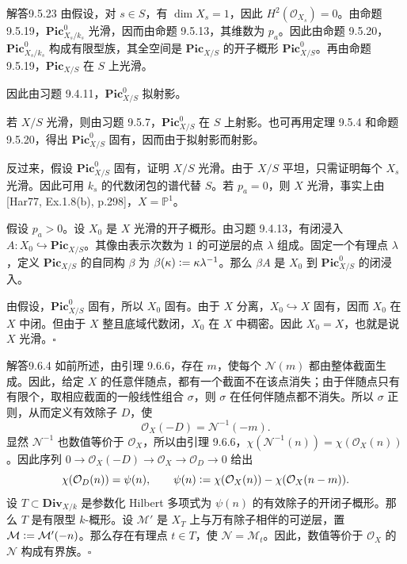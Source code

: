 \begin{origstatement}{解答}{9.5.23}\label{appA:ans9523}
由假设，对 $s\in S$，有 $\dim X_s=1$，因此 $H^2(\mathcal O_{X_s})=0$。由命题 9.5.19，$\mathbf{Pic}_{X_s/k_s}^0$ 光滑，因而由命题 9.5.13，其维数为 $p_a$。因此由命题 9.5.20，$\mathbf{Pic}_{X_s/k_s}^0$ 构成有限型族，其全空间是 $\mathbf{Pic}_{X/S}$ 的开子概形 $\mathbf{Pic}_{X/S}^0$。再由命题 9.5.19，$\mathbf{Pic}_{X/S}$ 在 $S$ 上光滑。

因此由习题 9.4.11，$\mathbf{Pic}_{X/S}^0$ 拟射影。

若 $X/S$ 光滑，则由习题 9.5.7，$\mathbf{Pic}_{X/S}^0$ 在 $S$ 上射影。也可再用定理 9.5.4 和命题 9.5.20，得出 $\mathbf{Pic}_{X/S}^0$ 固有，因而由于拟射影而射影。

反过来，假设 $\mathbf{Pic}_{X/S}^0$ 固有，证明 $X/S$ 光滑。由于 $X/S$ 平坦，只需证明每个 $X_s$ 光滑。因此可用 $k_s$ 的代数闭包的谱代替 $S$。若 $p_a=0$，则 $X$ 光滑，事实上由 [Har77, Ex.1.8(b), p.298]，$X=\mathbb P^1$。

假设 $p_a>0$。设 $X_0$ 是 $X$ 光滑的开子概形。由习题 9.4.13，有闭浸入 $A\colon X_0\hookrightarrow\mathbf{Pic}_{X/S}$。其像由表示次数为 $1$ 的可逆层的点 $\lambda$ 组成。固定一个有理点 $\lambda$，定义 $\mathbf{Pic}_{X/S}$ 的自同构 $\beta$ 为 $\beta(\kappa)\mathrel{\mathop:}=\kappa\lambda^{-1}$。那么 $\beta A$ 是 $X_0$ 到 $\mathbf{Pic}_{X/S}^0$ 的闭浸入。

由假设，$\mathbf{Pic}_{X/S}^0$ 固有，所以 $X_0$ 固有。由于 $X$ 分离，$X_0\hookrightarrow X$ 固有，因而 $X_0$ 在 $X$ 中闭。但由于 $X$ 整且底域代数闭，$X_0$ 在 $X$ 中稠密。因此 $X_0=X$，也就是说 $X$ 光滑。\hfill$\square$
\end{origstatement}

\begin{origstatement}{解答}{9.6.4}\label{appA:ans964}
如前所述，由引理 9.6.6，存在 $m$，使每个 $\mathcal N(m)$ 都由整体截面生成。因此，给定 $X$ 的任意伴随点，都有一个截面不在该点消失；由于伴随点只有有限个，取相应截面的一般线性组合 $\sigma$，则 $\sigma$ 在任何伴随点都不消失。所以 $\sigma$ 正则，从而定义有效除子 $D$，使
\[
 \mathcal O_X(-D)=\mathcal N^{-1}(-m).
\]
显然 $\mathcal N^{-1}$ 也数值等价于 $\mathcal O_X$，所以由引理 9.6.6，$\chi(\mathcal N^{-1}(n))=\chi(\mathcal O_X(n))$。因此序列 $0\to\mathcal O_X(-D)\to\mathcal O_X\to\mathcal O_D\to0$ 给出
\[
 \chi(\mathcal O_D(n))=\psi(n),\qquad
 \psi(n)\mathrel{\mathop:}=\chi(\mathcal O_X(n))-\chi(\mathcal O_X(n-m)).
\]
设 $T\subset\mathbf{Div}_{X/k}$ 是参数化 Hilbert 多项式为 $\psi(n)$ 的有效除子的开闭子概形。那么 $T$ 是有限型 $k$-概形。设 $\mathcal M'$ 是 $X_T$ 上与万有除子相伴的可逆层，置 $\mathcal M\mathrel{\mathop:}=\mathcal M'(-n)$。那么存在有理点 $t\in T$，使 $\mathcal N=\mathcal M_t$。因此，数值等价于 $\mathcal O_X$ 的 $\mathcal N$ 构成有界族。\hfill$\square$
\end{origstatement}

